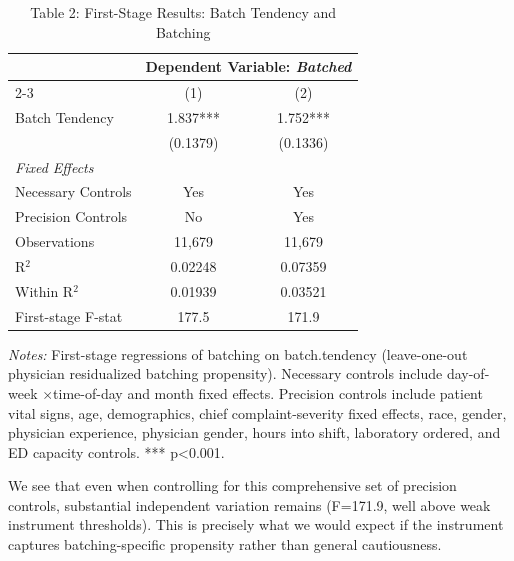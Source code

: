 \documentclass[11pt]{article}
\newcommand{\1}{\hbox{\rm 1\kern-.35em 1}}
\begin{document}
\begin{table}[t!]
\centering
\caption*{Table 2: First-Stage Results: Batch Tendency and Batching}

\begin{threeparttable}
\begin{tabular}{lcc}
\toprule 
& \multicolumn{2}{c}{Dependent Variable: \textit{Batched}}\\
\cmidrule(lr){2-3}
& (1) & (2) \\
\midrule
Batch Tendency 
    & 1.837*** & 1.752*** \\
    & (0.1379) & (0.1336) \\
\midrule
\textit{Fixed Effects} \\
Necessary Controls & Yes & Yes \\
Precision Controls & No & Yes \\
\midrule
Observations & 11{,}679 & 11{,}679 \\
R$^2$ & 0.02248 & 0.07359 \\
Within R$^2$ & 0.01939 & 0.03521 \\
First-stage F-stat & 177.5 & 171.9 \\
\bottomrule
\end{tabular}
\begin{flushleft}
\footnotesize
\textit{Notes:} First-stage regressions of batching on batch.tendency (leave-one-out physician residualized batching propensity). Necessary controls include day-of-week $\times$time-of-day and month fixed effects. Precision controls include patient vital signs, age, demographics, chief complaint-severity fixed effects, race, gender, physician experience, physician gender, hours into shift, laboratory ordered, and ED capacity controls. *** p<0.001.
\end{flushleft}
\end{threeparttable}
\end{table}

We see that even when controlling for this comprehensive set of precision controls, substantial independent variation remains (F=171.9, well above weak instrument thresholds). This is precisely what we would expect if the instrument captures batching-specific propensity rather than general cautiousness.
\end{document}
